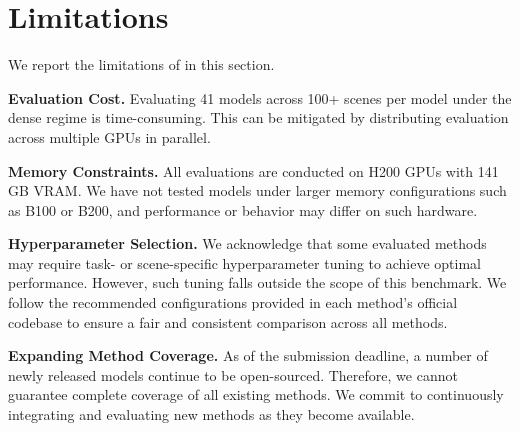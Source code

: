 \section{Limitations}
\label{appendix:limit}

We report the limitations of \benchmark in this section.

\noindent\textbf{Evaluation Cost.} 
Evaluating 41 models across 100+ scenes per model under the dense regime is time-consuming. This can be mitigated by distributing evaluation across multiple GPUs in parallel.

\noindent\textbf{Memory Constraints.}
All evaluations are conducted on H200 GPUs with 141\,GB VRAM. 
%
We have not tested models under larger memory configurations such as B100 or B200, and performance or behavior may differ on such hardware.

\noindent\textbf{Hyperparameter Selection.}
We acknowledge that some evaluated methods may require task- or scene-specific hyperparameter tuning to achieve optimal performance. However, such tuning falls outside the scope of this benchmark. We follow the recommended configurations provided in each method's official codebase to ensure a fair and consistent comparison across all methods.

\noindent\textbf{Expanding Method Coverage.}
As of the submission deadline, a number of newly released models continue to be open-sourced. 
%
Therefore, we cannot guarantee complete coverage of all existing methods.
%
We commit to continuously integrating and evaluating new methods as they become available.